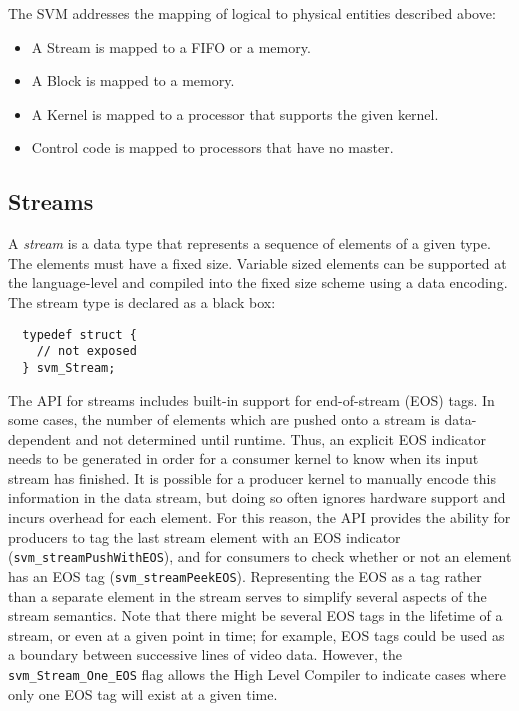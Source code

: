 
The SVM addresses the mapping of logical to physical entities
described above:

\begin{itemize}

\item A Stream is mapped to a FIFO or a memory.

\item A Block is mapped to a memory.

\item A Kernel is mapped to a processor that supports the given kernel.

\item Control code is mapped to processors that have no master.

\end{itemize}

\subsection{Streams}
\label{sec:streams}

A {\it stream} is a data type that represents a sequence of elements
of a given type.  The elements must have a fixed size. Variable sized
elements can be supported at the language-level and compiled into the
fixed size scheme using a data encoding. The stream type is declared
as a black box:
{\small
\begin{verbatim}
  typedef struct {
    // not exposed
  } svm_Stream;
\end{verbatim}}
The API for streams includes built-in support for end-of-stream (EOS)
tags.  In some cases, the number of elements which are pushed onto a
stream is data-dependent and not determined until runtime.  Thus, an
explicit EOS indicator needs to be generated in order for a consumer
kernel to know when its input stream has finished.  It is possible for
a producer kernel to manually encode this information in the data
stream, but doing so often ignores hardware support and incurs
overhead for each element.  For this reason, the API provides the
ability for producers to tag the last stream element with an EOS
indicator ({\tt svm\_streamPushWithEOS}), and for consumers to check
whether or not an element has an EOS tag ({\tt svm\_streamPeekEOS}).
Representing the EOS as a tag rather than a separate element in the
stream serves to simplify several aspects of the stream semantics.
Note that there might be several EOS tags in the lifetime of a stream,
or even at a given point in time; for example, EOS tags could be used
as a boundary between successive lines of video data.  However, the
{\tt svm\_Stream\_One\_EOS} flag allows the High Level Compiler to indicate
cases where only one EOS tag will exist at a given time.

